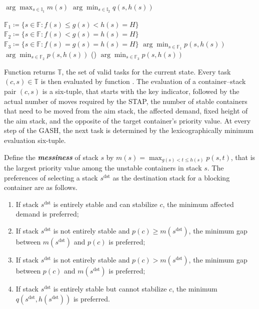 \documentclass[review,3p,times,12pt,number]{elsarticle}\usepackage{amsmath}\usepackage{amssymb}
\renewcommand{\gets}{\coloneqq}
\renewcommand{\emph}[1]{\textbf{\textit{#1}}}
\newcommand{\mds}{s^\mathrm{dst}}
\begin{document}
\begin{algorithm*}[htbp]
\begin{multicols}{2}
{  
  {
    \Return $\arg\max_{s\in\mathbb{I}_1} m(s)$\;
  }
  \Else
  {
    \Return $\arg\min_{s\in\mathbb{I}_2} q(s,h(s))$\;
  }

}




{
  $\mathbb{F}_1\gets \{s\in \mathbb{F}: f(s)\le g(s)<h(s)=H\}$\;
  $\mathbb{F}_2\gets \{s\in \mathbb{F}: f(s)< g(s)=h(s)=H\}$\;
  $\mathbb{F}_3\gets \{s\in \mathbb{F}: f(s)= g(s)=h(s)=H\}$\;
  {
    \Return $\arg\min_{s\in\mathbb{F}_1} p(s,h(s))$\;
  }
  {
    \Return $\arg\min_{s\in\mathbb{F}_2} p(s,h(s))$\;
  }
  \Else()
  {
    \Return $\arg\min_{s\in\mathbb{F}_3} p(s,h(s))$\;
  }
}

\end{multicols}
\BlankLine
\BlankLine
\end{algorithm*}



Function \Valid{} returns $\mathbb{T}$, the set of valid tasks for the current state. Every task $(c,s)\in\mathbb{T}$ is then evaluated by function . The evaluation of a container--stack pair $(c,s)$ is a six-tuple, that starts with the key indicator, followed by the actual number of moves required by the STAP, the number of  stable containers that need to be moved from the aim stack, the affected demand, fixed height of the aim stack, and the opposite of the target container's priority value. At every step of the GASH, the next task is determined by the lexicographically minimum evaluation six-tuple.


Define the \emph{messiness} of stack $s$ by $m(s)=\max_{g(s)<t\le h(s)}p(s,t)$, that is the largest priority value among the unstable containers in stack $s$. The preferences of selecting a stack $\mds$ as the destination stack for a blocking container are as follows.
\begin{enumerate}
\item If stack $\mds$ is entirely stable and can stabilize $c$, the minimum affected demand is preferred;
\item If stack $\mds$ is not entirely stable and $p(c)\ge m(\mds)$, the minimum gap between $m(\mds)$ and $p(c)$ is preferred;
\item If stack $\mds$ is not entirely stable and $p(c)> m(\mds)$, the minimum gap between $p(c)$ and $m(\mds)$ is preferred;
\item If stack $\mds$ is entirely stable but cannot stabilize $c$, the minimum $q(\mds,h(\mds))$ is preferred.
\end{enumerate}
\end{document}
